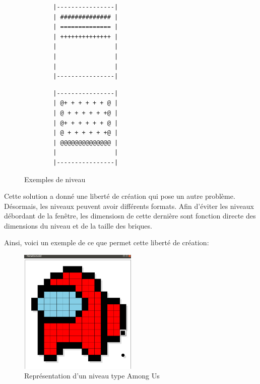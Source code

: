 \documentclass[french]{template}
\begin{document}
\begin{figure}[ht]
    \begin{minipage}{0.4\textwidth}
        \begin{verbatim}
        |----------------|
        | ############## |
        | ============== |
        | ++++++++++++++ |
        |                |
        |                |
        |                |
        |----------------|
        \end{verbatim}
    \end{minipage}
    \hfill
    \begin{minipage}{0.4\textwidth}
        \begin{verbatim}
        |----------------|
        | @+ + + + + + @ |
        | @ + + + + + +@ |
        | @+ + + + + + @ |
        | @ + + + + + +@ |
        | @@@@@@@@@@@@@@ |
        |                |
        |----------------|
        \end{verbatim}
    \end{minipage}
    \caption{Exemples de niveau}
    \label{fig:level.txt}
\end{figure}

Cette solution a donné une liberté de création qui pose un autre problème. Désormais, les niveaux peuvent avoir différents formats. Afin d'éviter les niveaux débordant de la fenêtre, les dimensiosn de cette dernière sont fonction directe des dimensions du niveau et de la taille des briques.

Ainsi, voici un exemple de ce que permet cette liberté de création:

\begin{figure}[ht]
    \centering
    \includegraphics[width=0.5\textwidth]{img/amongus.png}
    \caption{Représentation d'un niveau type Among Us}
    \label{fig:amongus}
\end{figure}
\end{document}
